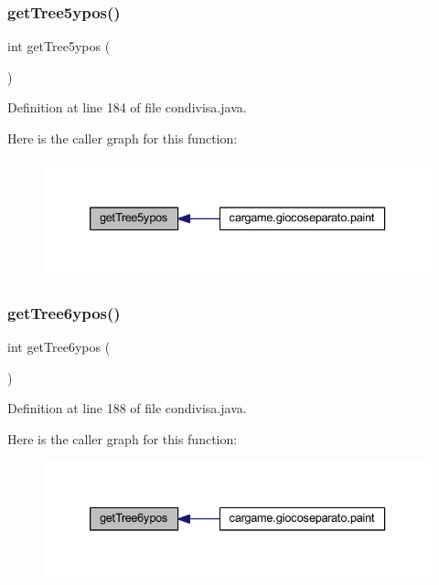 \subsubsection{\texorpdfstring{get\+Tree5ypos()}{getTree5ypos()}}
{\footnotesize\ttfamily int get\+Tree5ypos (\begin{DoxyParamCaption}{ }\end{DoxyParamCaption})}



Definition at line 184 of file condivisa.\+java.

Here is the caller graph for this function\+:
\nopagebreak
\begin{figure}[H]
\begin{center}
\leavevmode
\includegraphics[width=333pt]{classcargame_1_1condivisa_ab04fb0bbd43e196f4ce5f693ceeef61d_icgraph}
\end{center}
\end{figure}
\mbox{\label{classcargame_1_1condivisa_ae5ed8de123a8342b0b263a6edce54e96}} 
\subsubsection{\texorpdfstring{get\+Tree6ypos()}{getTree6ypos()}}
{\footnotesize\ttfamily int get\+Tree6ypos (\begin{DoxyParamCaption}{ }\end{DoxyParamCaption})}



Definition at line 188 of file condivisa.\+java.

Here is the caller graph for this function\+:
\nopagebreak
\begin{figure}[H]
\begin{center}
\leavevmode
\includegraphics[width=333pt]{classcargame_1_1condivisa_ae5ed8de123a8342b0b263a6edce54e96_icgraph}
\end{center}
\end{figure}
\mbox{\label{classcargame_1_1condivisa_a3e38fd4d482650ff5fbb4ed8482de884}} 
